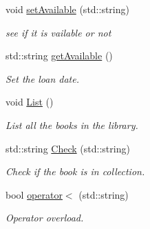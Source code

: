 \begin{DoxyCompactItemize}
void \hyperlink{classBook_a5077a2720ae494b0725a0b7baeb3e7f2}{set\+Available} (std\+::string)
\begin{DoxyCompactList}\small\item\em see if it is vailable or not \end{DoxyCompactList}\item 
std\+::string \hyperlink{classBook_a41d272a411cef781cbd44cb7eca9ac60}{get\+Available} ()
\begin{DoxyCompactList}\small\item\em Set the loan date. \end{DoxyCompactList}\item 
void \hyperlink{classBook_a2214e9b5fc10c125d8043b1dc50277f4}{List} ()
\begin{DoxyCompactList}\small\item\em List all the books in the library. \end{DoxyCompactList}\item 
std\+::string \hyperlink{classBook_a70e045711b346124d81f16210a67277a}{Check} (std\+::string)
\begin{DoxyCompactList}\small\item\em Check if the book is in collection. \end{DoxyCompactList}\item 
bool \hyperlink{classBook_a19dd030c3c0cbc1b9f04321165825e05}{operator$<$} (std\+::string)
\begin{DoxyCompactList}\small\item\em Operator overload. \end{DoxyCompactList}\end{DoxyCompactItemize}
